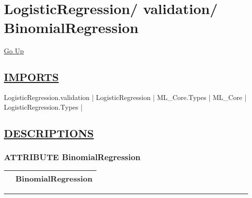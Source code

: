 \chapter*{\color{headfile}
{\large LogisticRegression\slash\hspace{0pt}}
{\large validation\slash\hspace{0pt}}
 \\
BinomialRegression
}
\hypertarget{ecldoc:toc:LogisticRegression.validation.BinomialRegression}{}
\hyperlink{ecldoc:toc:root/LogisticRegression/validation}{Go Up}

\section*{\underline{\textsf{IMPORTS}}}
\begin{doublespace}
{\large
LogisticRegression.validation |
LogisticRegression |
ML\_Core.Types |
ML\_Core |
LogisticRegression.Types |
}
\end{doublespace}

\section*{\underline{\textsf{DESCRIPTIONS}}}
\subsection*{\textsf{\colorbox{headtoc}{\color{white} ATTRIBUTE}
BinomialRegression}}

\hypertarget{ecldoc:logisticregression.validation.binomialregression}{}

{\renewcommand{\arraystretch}{1.5}
\begin{tabularx}{\textwidth}{|>{\raggedright\arraybackslash}l|X|}
\hline
\hspace{0pt}\mytexttt{\color{red} } & \textbf{BinomialRegression} \\
\hline
\end{tabularx}
}

\par


\rule{\linewidth}{0.5pt}
